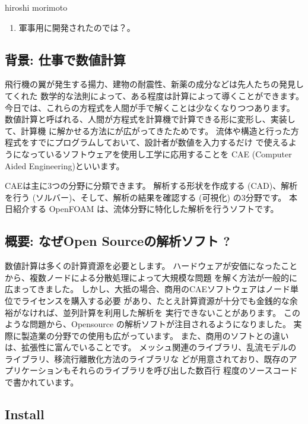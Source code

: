 \documentclass[mingoth,a4paper]{jsarticle}
\begin{document}
\begin{prework}{ hiroshi morimoto }
  \begin{enumerate}
  \item 軍事用に開発されたのでは？。
  \end{enumerate}
\end{prework}



\subsection{背景: 仕事で数値計算}
飛行機の翼が発生する揚力、建物の耐震性、新薬の成分などは先人たちの発見してくれた
数学的な法則によって、ある程度は計算によって導くことができます。
今日では、これらの方程式を人間が手で解くことは少なくなりつつあります。
数値計算と呼ばれる、人間が方程式を計算機で計算できる形に変形し、実装して、計算機
に解かせる方法にが広がってきたためです。
流体や構造と行った方程式をすでにプログラムしておいて、設計者が数値を入力するだけ
で使えるようになっているソフトウェアを使用し工学に応用することを CAE (Computer
Aided Engineering)といいます。

CAEは主に3つの分野に分類できます。
解析する形状を作成する (CAD)、解析を行う (ソルバー)、そして、解析の結果を確認する
(可視化) の3分野です。
本日紹介する OpenFOAM は、流体分野に特化した解析を行うソフトです。

\subsection{概要: なぜOpen Sourceの解析ソフト ? }
数値計算は多くの計算資源を必要とします。
ハードウェアが安価になったことから、複数ノードによる分散処理によって大規模な問題
を解く方法が一般的に広まってきました。
しかし、大抵の場合、商用のCAEソフトウェアはノード単位でライセンスを購入する必要
があり、たとえ計算資源が十分でも金銭的な余裕がなければ、並列計算を利用した解析を
実行できないことがあります。
このような問題から、Opensource の解析ソフトが注目されるようになりました。
実際に製造業の分野での使用も広がっています。
また、商用のソフトとの違いは、拡張性に富んでいることです。
メッシュ関連のライブラリ、乱流モデルのライブラリ、移流行離散化方法のライブラリな
どが用意されており、既存のアプリケーションもそれらのライブラリを呼び出した数百行
程度のソースコードで書かれています。

\subsection{Install}
\end{document}
